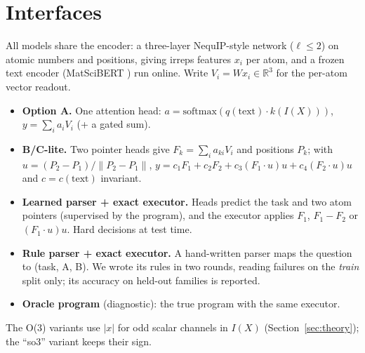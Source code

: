 \documentclass[10pt]{article}
\newcommand{\R}{\mathbb{R}}
\begin{document}
\section{Interfaces}\label{sec:interfaces}
All models share the encoder: a three-layer NequIP-style network ($\ell\le2$) on atomic numbers and positions, giving irreps
features $x_i$ per atom, and a frozen text encoder (MatSciBERT \citep{matscibert}) run online. Write $V_i=W x_i\in\R^3$ for the per-atom vector readout.
\begin{itemize}
\item \textbf{Option A.} One attention head: $a=\mathrm{softmax}(q(\text{text})\cdot k(I(X)))$, $y=\sum_i a_iV_i$ (+ a gated sum).
\item \textbf{B/C-lite.} Two pointer heads give $F_k=\sum_i a_{ki}V_i$ and positions $P_k$; with $u=(P_2-P_1)/\|P_2-P_1\|$,
$y=c_1F_1+c_2F_2+c_3(F_1\!\cdot\!u)u+c_4(F_2\!\cdot\!u)u$ and $c=c(\text{text})$ invariant.
\item \textbf{Learned parser + exact executor.} Heads predict the task and two atom pointers (supervised by the program), and the
executor applies $F_1$, $F_1-F_2$ or $(F_1\!\cdot\!u)u$. Hard decisions at test time.
\item \textbf{Rule parser + exact executor.} A hand-written parser maps the question to (task, A, B). We wrote its rules in two rounds,
reading failures on the \emph{train} split only; its accuracy on held-out families is reported.
\item \textbf{Oracle program} (diagnostic): the true program with the same executor.
\end{itemize}
The O(3) variants use $|x|$ for odd scalar channels in $I(X)$ (Section~\ref{sec:theory}); the ``so3'' variant keeps their sign.
\end{document}
